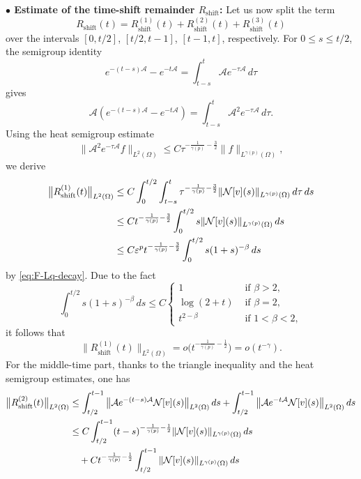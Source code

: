 \documentclass[a4paper,11pt]{article} %
\theoremstyle{remark}
\theoremstyle{definition}
\numberwithin{equation}{section}
\begin{document}
\noindent\textbf{$\bullet$ Estimate of the time-shift remainder $R_{\mathrm{shift}}$:} Let us now split the term
\[
R_{\mathrm{shift}}(t)
=
R_{\mathrm{shift}}^{(1)}(t)
+
R_{\mathrm{shift}}^{(2)}(t)
+
R_{\mathrm{shift}}^{(3)}(t)
\]
over the intervals $[0,t/2]$, $[t/2,t-1]$, $[t-1,t]$, respectively. For \(0\le s\le t/2\), the semigroup identity
\[
e^{-(t-s)\mathcal{A}}-e^{-t\mathcal{A}}
=
\int_{t-s}^{t}\mathcal{A}e^{-\tau \mathcal{A}}\,d\tau
\]
gives
\[
\mathcal{A}\left(e^{-(t-s)\mathcal{A}}-e^{-t\mathcal{A}}\right)
=
\int_{t-s}^{t}\mathcal{A}^2e^{-\tau \mathcal{A}}\,d\tau.
\]
Using the heat semigroup estimate
\begin{equation*}
\label{eq:heat-semigroup-A2}
\big\|\mathcal{A}^2e^{-\tau \mathcal{A}}f\big\|_{L^2(\Omega)}
\le
C\tau^{-\frac{1}{\gamma(p)}-\frac{3}{2}}\|f\|_{L^{\gamma(p)}(\Omega)},
\end{equation*}
we derive
\begin{align*}
\big\|R_{\mathrm{shift}}^{(1)}(t)\big\|_{L^2(\Omega)}
&\le
C\int_0^{t/2}
\int_{t-s}^{t}
\tau^{-\frac{1}{\gamma(p)}-\frac{3}{2}}\|\mathcal{N}[v](s)\|_{L^{\gamma(p)}(\Omega)}\,d\tau\,ds \notag\\
&\le
Ct^{-\frac{1}{\gamma(p)}-\frac{3}{2}}
\int_0^{t/2}
s\|\mathcal{N}[v](s)\|_{L^{\gamma(p)}(\Omega)}\,ds \notag\\
&\le
C\varepsilon^p t^{-\frac{1}{\gamma(p)}-\frac{3}{2}}
\int_0^{t/2}
s(1+s)^{-\beta}\,ds
\end{align*}
by \eqref{eq:F-Lq-decay}. Due to the fact
\[
\int_0^{t/2}
s(1+s)^{-\beta}\,ds
\le
C
\begin{cases}
1 &\text{ if }\beta>2,\\
\log(2+t) &\text{ if }\beta=2,\\
t^{2-\beta} &\text{ if }1<\beta<2,
\end{cases}
\]
it follows that
\begin{equation}
\label{eq:Rshift1-little-o}
\big\|R_{\mathrm{shift}}^{(1)}(t)\big\|_{L^2(\Omega)}
=
o\Big(t^{-\frac{1}{\gamma(p)}-\frac{1}{2}}\Big)
=
o(t^{-\gamma}).
\end{equation}
For the middle-time part, thanks to the triangle inequality and the heat semigroup estimates, one has
\begin{align*}
\big\|R_{\mathrm{shift}}^{(2)}(t)\big\|_{L^2(\Omega)}
&\le
\int_{t/2}^{t-1}
\big\|\mathcal{A}e^{-(t-s)\mathcal{A}}\mathcal{N}[v](s)\big\|_{L^2(\Omega)}\,ds +
\int_{t/2}^{t-1}
\big\|\mathcal{A}e^{-t\mathcal{A}}\mathcal{N}[v](s)\big\|_{L^2(\Omega)}\,ds \notag\\
&\le
C\int_{t/2}^{t-1}
(t-s)^{-\frac{1}{\gamma(p)}-\frac{1}{2}}\|\mathcal{N}[v](s)\|_{L^{\gamma(p)}(\Omega)}\,ds \notag\\
&\quad+
Ct^{-\frac{1}{\gamma(p)}-\frac{1}{2}}
\int_{t/2}^{t-1}\|\mathcal{N}[v](s)\|_{L^{\gamma(p)}(\Omega)}\,ds
\end{align*}
\end{document}
